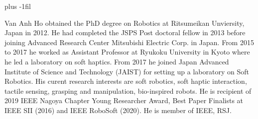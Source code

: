 \documentclass[10pt,letterpaper,journal,final,twoside,twocolumn,nofonttune]{IEEEtran}
\begin{document}
\baselineskip plus -1fil
\begin{IEEEbiography}{Van Anh Ho} 
obtained the PhD degree on Robotics at Ritsumeikan Unviersity, Japan in 2012. He had completed the JSPS Post doctoral fellow in 2013 before joining Advanced Research Center Mitsubishi Electric Corp. in Japan. From 2015 to 2017 he worked as Assistant Professor at Ryukoku University in Kyoto where he led a laboratory on soft haptics. From 2017 he joined Japan Advanced Institute of Science and Technology (JAIST) for setting up a laboratory on Soft Robotics. His curent research interests are soft robotics, soft haptic interaction, tactile sensing, grasping and manipulation, bio-inspired robots. He is recipient of 2019 IEEE Nagoya Chapter Young Researcher Award, Best Paper Finalists at IEEE SII (2016) and IEEE RoboSoft (2020). He is member of IEEE, RSJ.
\end{IEEEbiography}
\vfill
\end{document}

